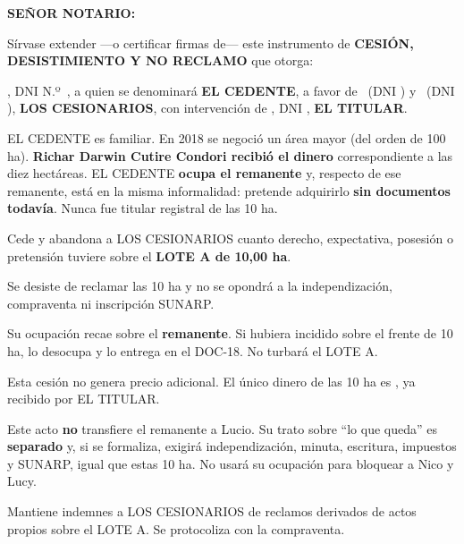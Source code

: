\documentclass[12pt,a4paper]{article}
\begin{document}


\noindent \textbf{SEÑOR NOTARIO:}

\vspace{0.2em}
\noindent Sírvase extender ---o certificar firmas de--- este instrumento de \textbf{CESIÓN, DESISTIMIENTO Y NO RECLAMO} que otorga:

\vspace{0.2em}
\noindent \textbf{\IntermediarioNombre}, DNI N.º\ \IntermediarioDNI, a quien se denominará \textbf{EL CEDENTE}, a favor de \textbf{\CompradorUnoNombre}\ (DNI \CompradorUnoDNI) y \textbf{\CompradorDosNombre}\ (DNI \CompradorDosDNI), \textbf{LOS CESIONARIOS}, con intervención de \textbf{\VendedorNombreCompleto}, DNI \VendedorDNI, \textbf{EL TITULAR}.

EL CEDENTE es familiar. En 2018 se negoció un área mayor (del orden de 100 ha). \textbf{Richar Darwin Cutire Condori recibió el dinero} correspondiente a las diez hectáreas. EL CEDENTE \textbf{ocupa el remanente} y, respecto de ese remanente, está en la misma informalidad: pretende adquirirlo \textbf{sin documentos todavía}. Nunca fue titular registral de las 10 ha.

Cede y abandona a LOS CESIONARIOS cuanto derecho, expectativa, posesión o pretensión tuviere sobre el \textbf{LOTE A de 10,00 ha}.

Se desiste de reclamar las 10 ha y no se opondrá a la independización, compraventa ni inscripción SUNARP.

Su ocupación recae sobre el \textbf{remanente}. Si hubiera incidido sobre el frente de 10 ha, lo desocupa y lo entrega en el DOC-18. No turbará el LOTE A.

Esta cesión no genera precio adicional. El único dinero de las 10 ha es \MontoPago, ya recibido por EL TITULAR.

Este acto \textbf{no} transfiere el remanente a Lucio. Su trato sobre ``lo que queda'' es \textbf{separado} y, si se formaliza, exigirá independización, minuta, escritura, impuestos y SUNARP, igual que estas 10 ha. No usará su ocupación para bloquear a Nico y Lucy.

Mantiene indemnes a LOS CESIONARIOS de reclamos derivados de actos propios sobre el LOTE A. Se protocoliza con la compraventa.

\CierreMinuta
\LugarFecha
{}

\vspace{0.5em}
\noindent
{}
\end{document}
